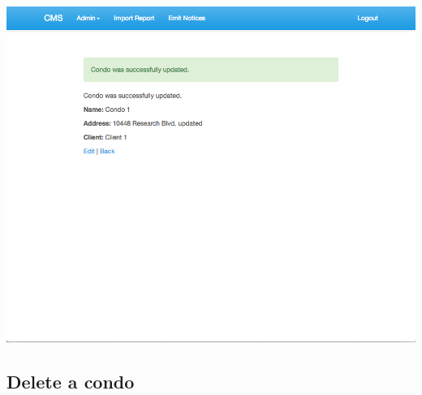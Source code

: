 \begin{itemize}
    \includegraphics[scale=0.25]{./images/ss/condo/edit/5.png}
\end{itemize}

\subsection*{Delete a condo}

